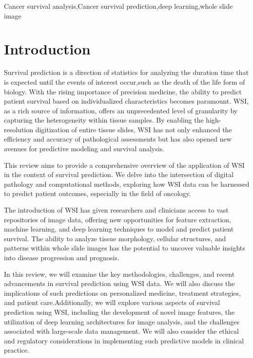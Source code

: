 \documentclass[journal,twoside,web]{ieeecolor}
\begin{document}
\begin{IEEEkeywords}
Cancer survival analysis,Cancer survival prediction,deep learning,whole slide image
\end{IEEEkeywords}

\section{Introduction}
\label{sec:introduction}

Survival prediction is a direction of statistics for analyzing the duration time that is expected until the events of interest occur,such as the death of the life form of biology.
With the rising importance of precision medicine, the ability to predict patient survival based on individualized characteristics becomes paramount.  WSI, as a rich source of information, offers an unprecedented level of granularity by capturing the heterogeneity within tissue samples. By enabling the high-resolution digitization of entire tissue slides, WSI has not only enhanced the efficiency and accuracy of pathological assessments but has also opened new avenues for predictive modeling and survival analysis.

This review aims to provide a comprehensive overview of the application of WSI in the context of survival prediction. We delve into the intersection of digital pathology and computational methods, exploring how WSI data can be harnessed to predict patient outcomes, especially in the field of oncology.

The introduction of WSI has given researchers and clinicians access to vast repositories of image data, offering new opportunities for feature extraction, machine learning, and deep learning techniques to model and predict patient survival. The ability to analyze tissue morphology, cellular structures, and patterns within whole slide images has the potential to uncover valuable insights into disease progression and prognosis.

In this review, we will examine the key methodologies, challenges, and recent advancements in survival prediction using WSI data. We will also discuss the implications of such predictions on personalized medicine, treatment strategies, and patient care.Additionally, we will explore various aspects of survival prediction using WSI, including the development of novel image features, the utilization of deep learning architectures for image analysis, and the challenges associated with large-scale data management.  We will also consider the ethical and regulatory considerations in implementing such predictive models in clinical practice.
\end{document}
